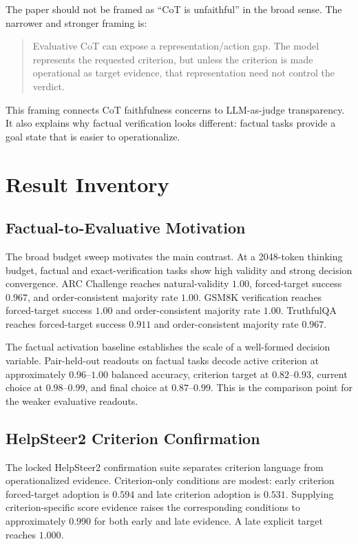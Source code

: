 \documentclass[11pt]{article}
\begin{document}
The paper should not be framed as ``CoT is unfaithful'' in the broad sense.
The narrower and stronger framing is:

\begin{quote}
  Evaluative CoT can expose a representation/action gap. The model represents
  the requested criterion, but unless the criterion is made operational as
  target evidence, that representation need not control the verdict.
\end{quote}

This framing connects CoT faithfulness concerns \citep{lanham2023faithfulness}
to LLM-as-judge transparency. It also explains why factual verification looks
different: factual tasks provide a goal state that is easier to operationalize.

\section{Result Inventory}

\subsection{Factual-to-Evaluative Motivation}

The broad budget sweep motivates the main contrast. At a 2048-token thinking
budget, factual and exact-verification tasks show high validity and strong
decision convergence. ARC Challenge reaches natural-validity $1.00$,
forced-target success $0.967$, and order-consistent majority rate $1.00$.
GSM8K verification reaches forced-target success $1.00$ and order-consistent
majority rate $1.00$. TruthfulQA reaches forced-target success $0.911$ and
order-consistent majority rate $0.967$.

The factual activation baseline establishes the scale of a well-formed
decision variable. Pair-held-out readouts on factual tasks decode active
criterion at approximately $0.96$--$1.00$ balanced accuracy, criterion target
at $0.82$--$0.93$, current choice at $0.98$--$0.99$, and final choice at
$0.87$--$0.99$. This is the comparison point for the weaker evaluative
readouts.

\subsection{HelpSteer2 Criterion Confirmation}

The locked HelpSteer2 confirmation suite separates criterion language from
operationalized evidence. Criterion-only conditions are modest: early
criterion forced-target adoption is $0.594$ and late criterion adoption is
$0.531$. Supplying criterion-specific score evidence raises the corresponding
conditions to approximately $0.990$ for both early and late evidence. A late
explicit target reaches $1.000$.
\end{document}
